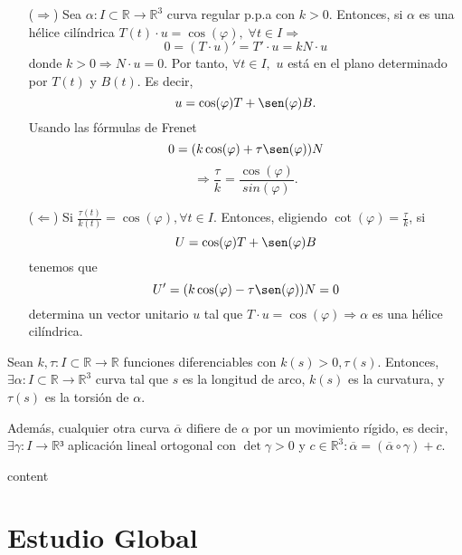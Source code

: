 \begin{dem}
  \begin{enumerate}[label=(\roman*)]
    \item []
    \item [($\Rightarrow$)] Sea $\alpha  : I \subset \mathbb{R} \to \mathbb{R}^{3}$ curva regular p.p.a con $k>0$. Entonces, si $\alpha$ es una hélice cilíndrica $T(t) \cdot u = \cos(\varphi), \; \forall t \in I \Rightarrow$
      \[ 
        0 = (T \cdot u)' = T' \cdot u = kN \cdot u
      \] 
      donde $k>0 \Rightarrow N \cdot u = 0$. Por tanto, $\forall t \in I,$ $u$ está en el plano determinado por $T(t)$ y $B(t)$. Es decir,
      \[ 
        u = \cos(\varphi)T + \sen(\varphi)B .
      \] 
      Usando las fórmulas de Frenet
      \[ 
        0 = (k \cos(\varphi) + \tau \sen(\varphi))N 
      \] 
      \[ 
        \Rightarrow \frac{\tau}{k} = \frac{\cos(\varphi)}{sin(\varphi)}.
      \] 
    \item [($\Leftarrow$)] Si $\frac{\tau(t)}{k(t)} = \cos(\varphi), \forall t \in I$. Entonces, eligiendo $\cot(\varphi) = \frac{\tau}{k}$, si
      \[ 
        U = \cos(\varphi)T + \sen(\varphi)B 
      \] 
      tenemos que
      \[ 
        U' = (k \cos(\varphi) - \tau \sen(\varphi))N = 0 
      \] 
      determina un vector unitario $u$ tal que $T \cdot u = \cos(\varphi) \Rightarrow \alpha$ es una hélice cilíndrica.
  \end{enumerate}
\end{dem}

\begin{theo}
  Sean $k,\tau: I \subset \mathbb{R} \to \mathbb{R}$ funciones diferenciables con $k(s) > 0, \tau(s)$. Entonces, $\exists \alpha  : I \subset \mathbb{R} \to \mathbb{R}^{3}$ curva tal que $s$ es la longitud de arco, $k(s)$ es la curvatura, y $\tau(s)$ es la torsión de $\alpha$.

  Además, cualquier otra curva $\overline{\alpha}$ difiere de $\alpha$ por un movimiento rígido, es decir, $\exists \gamma: I \to \mathbb{R}³$ aplicación lineal ortogonal con $\det \gamma > 0 $ y $c \in \mathbb{R}^{3}: \overline{\alpha} = (\overline{\alpha} \circ \gamma) + c$.
\end{theo}

\begin{dem}
  content
\end{dem}

\chapter{Estudio Global}
